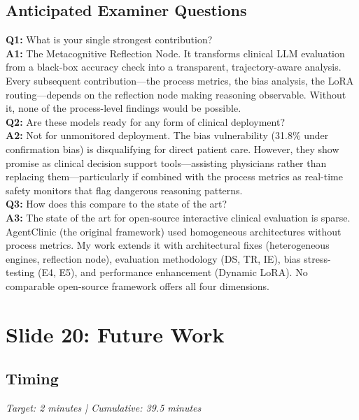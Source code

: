 \subsection*{Anticipated Examiner Questions}
\begin{qabox}
\textbf{Q1:} What is your single strongest contribution? \\
\textbf{A1:} The Metacognitive Reflection Node. It transforms clinical LLM evaluation from a black-box accuracy check into a transparent, trajectory-aware analysis. Every subsequent contribution---the process metrics, the bias analysis, the LoRA routing---depends on the reflection node making reasoning observable. Without it, none of the process-level findings would be possible. \\[6pt]
\textbf{Q2:} Are these models ready for any form of clinical deployment? \\
\textbf{A2:} Not for unmonitored deployment. The bias vulnerability (31.8\% under confirmation bias) is disqualifying for direct patient care. However, they show promise as clinical decision support tools---assisting physicians rather than replacing them---particularly if combined with the process metrics as real-time safety monitors that flag dangerous reasoning patterns. \\[6pt]
\textbf{Q3:} How does this compare to the state of the art? \\
\textbf{A3:} The state of the art for open-source interactive clinical evaluation is sparse. AgentClinic (the original framework) used homogeneous architectures without process metrics. My work extends it with architectural fixes (heterogeneous engines, reflection node), evaluation methodology (DS, TR, IE), bias stress-testing (E4, E5), and performance enhancement (Dynamic LoRA). No comparable open-source framework offers all four dimensions.
\end{qabox}



\section{Slide 20: Future Work}

\subsection*{Timing}
\textit{Target: 2 minutes | Cumulative: 39.5 minutes}


